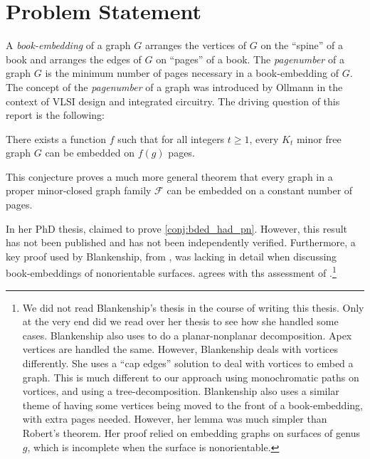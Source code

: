 \section{Problem Statement}

A \textit{book-embedding} of a graph $G$ arranges the vertices of $G$ on the ``spine'' of a book and arranges the edges of $G$ on ``pages'' of a book. The \textit{pagenumber} of a graph \(G\) is the minimum number of pages necessary in a book-embedding of \(G\). The concept of the \textit{pagenumber} of a graph was introduced by Ollmann \cite{ollmannBookThicknessVarious1973} in the context of VLSI design and integrated circuitry. 
The driving question of this report is the following:
\begin{conjecture}\label{conj:bded_had_pn}
	There exists a function $f$ such that for all integers $t \geq 1$, every $K_t$ minor free graph $G$ can be embedded on $f(g)$ pages.
\end{conjecture}

This conjecture proves a much more general theorem that every graph in a proper minor-closed graph family $\mathcal{F}$ can be embedded on a constant number of pages. 

In her PhD thesis, \textcite{Blankenship-PhD03} claimed to prove \cref{conj:bded_had_pn}. However, this result has not been published and has not been independently verified. Furthermore, a key proof used by Blankenship, from \textcite{heathPagenumberGenusGraphs1992}, was lacking in detail when discussing book-embeddings of nonorientable surfaces. \textcite{nakamotoBookEmbeddingProjectiveplanar2015} agrees with ths assessment of \textcite{heathPagenumberGenusGraphs1992}.\footnote{
	We did not read Blankenship's thesis in the course of writing this thesis. Only at the very end did we read over her thesis to see how she handled some cases. 
	Blankenship also uses \textcite{heathPagenumberGenusGraphs1992} to do a planar-nonplanar decomposition. Apex vertices are handled the same. However, Blankenship deals with vortices differently. She uses a ``cap edges'' solution to deal with vortices to embed a graph. This is much different to our approach using monochromatic paths on vortices, and using a tree-decomposition. 
	Blankenship also uses a similar theme of having some vertices being moved to the front of a book-embedding, with extra pages needed. However, her lemma was much simpler than Robert's theorem. Her proof relied on \textcite{heathPagenumberGenusGraphs1992} embedding graphs on surfaces of genus $g$, which is incomplete when the surface is nonorientable. 

}


